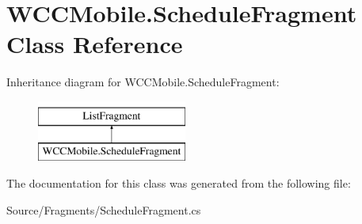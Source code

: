 \hypertarget{class_w_c_c_mobile_1_1_schedule_fragment}{}\section{W\+C\+C\+Mobile.\+Schedule\+Fragment Class Reference}
\label{class_w_c_c_mobile_1_1_schedule_fragment}
Inheritance diagram for W\+C\+C\+Mobile.\+Schedule\+Fragment\+:\begin{figure}[H]
\begin{center}
\leavevmode
\includegraphics[height=2.000000cm]{class_w_c_c_mobile_1_1_schedule_fragment}
\end{center}
\end{figure}


The documentation for this class was generated from the following file\+:\begin{DoxyCompactItemize}
\item 
Source/\+Fragments/Schedule\+Fragment.\+cs\end{DoxyCompactItemize}
